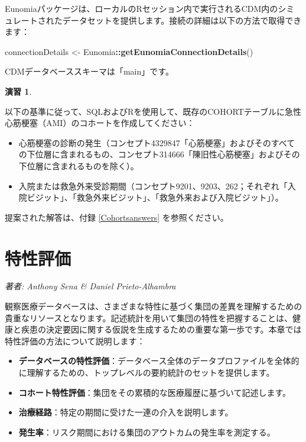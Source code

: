 \documentclass[
  11pt]{book}
\newenvironment{Shaded}{\begin{snugshade}}{\end{snugshade}}
\newcommand{\FunctionTok}[1]{\textcolor[rgb]{0.13,0.29,0.53}{\textbf{#1}}}
\newcommand{\NormalTok}[1]{#1}
\newcommand{\OtherTok}[1]{\textcolor[rgb]{0.56,0.35,0.01}{#1}}
\newcommand{\SpecialCharTok}[1]{\textcolor[rgb]{0.81,0.36,0.00}{\textbf{#1}}}
\providecommand{\tightlist}{%
  \setlength{\itemsep}{0pt}\setlength{\parskip}{0pt}}
\theoremstyle{definition}
\theoremstyle{definition}
\theoremstyle{definition}
\newtheorem{exercise}{演習}[chapter]
\theoremstyle{definition}
\theoremstyle{remark}
\begin{document}
Eunomiaパッケージは、ローカルのRセッション内で実行されるCDM内のシミュレートされたデータセットを提供します。接続の詳細は以下の方法で取得できます：

\begin{Shaded}
\begin{Highlighting}[]
\NormalTok{connectionDetails }\OtherTok{\textless{}{-}}\NormalTok{ Eunomia}\SpecialCharTok{::}\FunctionTok{getEunomiaConnectionDetails}\NormalTok{()}
\end{Highlighting}
\end{Shaded}

CDMデータベーススキーマは「main」です。

\begin{exercise}
\protect\hypertarget{exr:exerciseCohortsSql}{}\label{exr:exerciseCohortsSql}

以下の基準に従って、SQLおよびRを使用して、既存のCOHORTテーブルに急性心筋梗塞（AMI）のコホートを作成してください：

\begin{itemize}
\tightlist
\item
  心筋梗塞の診断の発生（コンセプト4329847「心筋梗塞」およびそのすべての下位層に含まれるもの、コンセプト314666「陳旧性心筋梗塞」およびその下位層に含まれるものを除く）。
\item
  入院または救急外来受診期間（コンセプト9201、9203、262；それぞれ「入院ビジット」、「救急外来ビジット」、「救急外来および入院ビジット」）。
\end{itemize}

\end{exercise}

提案された解答は、付録 \ref{Cohortsanswers} を参照ください。

\chapter{特性評価}\label{Characterization}

\emph{著者: Anthony Sena \& Daniel Prieto-Alhambra}

観察医療データベースは、さまざまな特性に基づく集団の差異を理解するための貴重なリソースとなります。記述統計を用いて集団の特性を把握することは、健康と疾患の決定要因に関する仮説を生成するための重要な第一歩です。本章では特性評価の方法について説明します：

\begin{itemize}
\tightlist
\item
  \textbf{データベースの特性評価}：データベース全体のデータプロファイルを全体的に理解するための、トップレベルの要約統計のセットを提供します。
\item
  \textbf{コホート特性評価}：集団をその累積的な医療履歴に基づいて記述します。
\item
  \textbf{治療経路}：特定の期間に受けた一連の介入を説明します。
\item
  \textbf{発生率}：リスク期間における集団のアウトカムの発生率を測定する。
\end{itemize}
\end{document}

